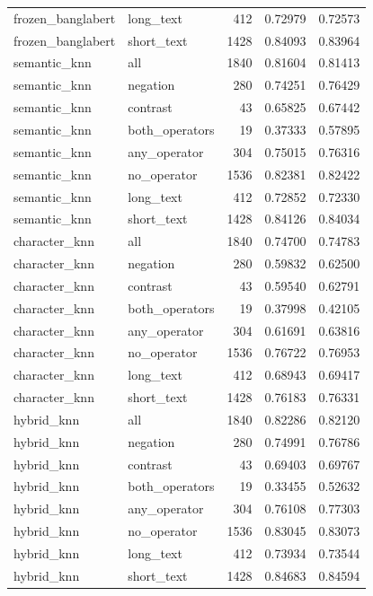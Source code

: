 \begin{tabular}{llrrr}
frozen_banglabert & long_text & 412 & 0.72979 & 0.72573 \\
frozen_banglabert & short_text & 1428 & 0.84093 & 0.83964 \\
semantic_knn & all & 1840 & 0.81604 & 0.81413 \\
semantic_knn & negation & 280 & 0.74251 & 0.76429 \\
semantic_knn & contrast & 43 & 0.65825 & 0.67442 \\
semantic_knn & both_operators & 19 & 0.37333 & 0.57895 \\
semantic_knn & any_operator & 304 & 0.75015 & 0.76316 \\
semantic_knn & no_operator & 1536 & 0.82381 & 0.82422 \\
semantic_knn & long_text & 412 & 0.72852 & 0.72330 \\
semantic_knn & short_text & 1428 & 0.84126 & 0.84034 \\
character_knn & all & 1840 & 0.74700 & 0.74783 \\
character_knn & negation & 280 & 0.59832 & 0.62500 \\
character_knn & contrast & 43 & 0.59540 & 0.62791 \\
character_knn & both_operators & 19 & 0.37998 & 0.42105 \\
character_knn & any_operator & 304 & 0.61691 & 0.63816 \\
character_knn & no_operator & 1536 & 0.76722 & 0.76953 \\
character_knn & long_text & 412 & 0.68943 & 0.69417 \\
character_knn & short_text & 1428 & 0.76183 & 0.76331 \\
hybrid_knn & all & 1840 & 0.82286 & 0.82120 \\
hybrid_knn & negation & 280 & 0.74991 & 0.76786 \\
hybrid_knn & contrast & 43 & 0.69403 & 0.69767 \\
hybrid_knn & both_operators & 19 & 0.33455 & 0.52632 \\
hybrid_knn & any_operator & 304 & 0.76108 & 0.77303 \\
hybrid_knn & no_operator & 1536 & 0.83045 & 0.83073 \\
hybrid_knn & long_text & 412 & 0.73934 & 0.73544 \\
hybrid_knn & short_text & 1428 & 0.84683 & 0.84594 \\
\bottomrule
\end{tabular}
